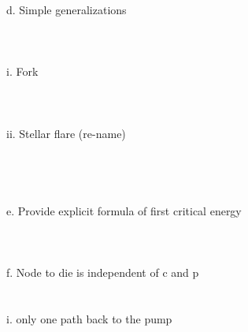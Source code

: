 \documentclass{amsart}
\theoremstyle{plain}
\numberwithin{equation}{section}
\begin{document}
 d. Simple generalizations\\
\\
\\
\\
  i. Fork\\
	\\
	\\
	\\
	ii. Stellar flare (re-name)\\
	\\
	\\
	\\
	\\
 e. Provide explicit formula of first critical energy\\
\\
\\
\\
 f. Node to die is independent of c and p\\
\\
\\
  i. only one path back to the pump\\
	\\
\\
\end{document}
